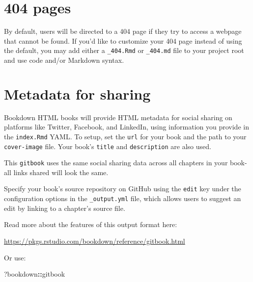 \documentclass[
]{book}
\newenvironment{Shaded}{\begin{snugshade}}{\end{snugshade}}
\newcommand{\NormalTok}[1]{#1}
\newcommand{\SpecialCharTok}[1]{\textcolor[rgb]{0.81,0.36,0.00}{\textbf{#1}}}
\theoremstyle{definition}
\theoremstyle{definition}
\theoremstyle{definition}
\theoremstyle{definition}
\theoremstyle{remark}
\begin{document}
\hypertarget{pages}{%
\section{404 pages}\label{pages}}

By default, users will be directed to a 404 page if they try to access a webpage that cannot be found. If you'd like to customize your 404 page instead of using the default, you may add either a \texttt{\_404.Rmd} or \texttt{\_404.md} file to your project root and use code and/or Markdown syntax.

\hypertarget{metadata-for-sharing}{%
\section{Metadata for sharing}\label{metadata-for-sharing}}

Bookdown HTML books will provide HTML metadata for social sharing on platforms like Twitter, Facebook, and LinkedIn, using information you provide in the \texttt{index.Rmd} YAML. To setup, set the \texttt{url} for your book and the path to your \texttt{cover-image} file. Your book's \texttt{title} and \texttt{description} are also used.

This \texttt{gitbook} uses the same social sharing data across all chapters in your book- all links shared will look the same.

Specify your book's source repository on GitHub using the \texttt{edit} key under the configuration options in the \texttt{\_output.yml} file, which allows users to suggest an edit by linking to a chapter's source file.

Read more about the features of this output format here:

\url{https://pkgs.rstudio.com/bookdown/reference/gitbook.html}

Or use:

\begin{Shaded}
\begin{Highlighting}[]
\NormalTok{?bookdown}\SpecialCharTok{::}\NormalTok{gitbook}
\end{Highlighting}
\end{Shaded}


  
\end{document}

